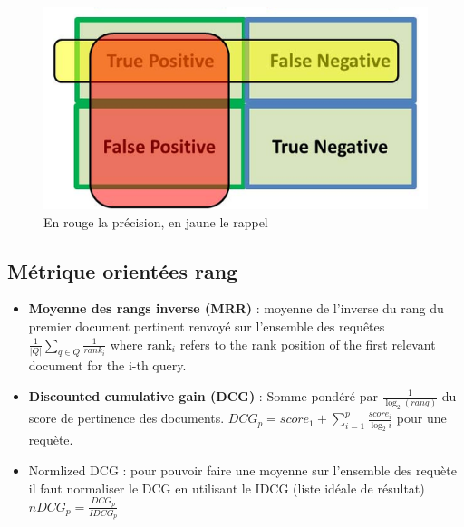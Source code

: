 \documentclass{article}
\theoremstyle{plain}%
\theoremstyle{definition}
\theoremstyle{remark}
\begin{document}
\begin{figure}[!htbp]
    \centering
    \includegraphics*[width=.5\textwidth]{precision_recall_conf_matrix.png}
    \caption{En rouge la précision, en jaune le rappel}
    \label{fig:precision_recall}
\end{figure}

\subsection{Métrique orientées rang}
\begin{itemize}
    \item \textbf{Moyenne des rangs inverse (MRR)} : moyenne de l'inverse du rang du premier document pertinent renvoyé sur l'ensemble des requêtes $ \frac{1}{\left| Q \right| } \sum_{q \in Q}^{} \frac{1}{rank_i} $ where $ \text{rank}_{i}$ refers to the rank position of the first relevant document for the i-th query.
    
    \item \textbf{Discounted cumulative gain (DCG)} :  Somme pondéré par $ \frac{1}{\log_{2} (rang)} $ du score de pertinence des documents. $ DCG_p = score_1 + \sum_{i=1}^{p} \frac{score_i}{\log_{2} i} $ pour une requète. 
    \item Normlized DCG : pour pouvoir faire une moyenne sur l'ensemble des requète il faut normaliser le DCG en utilisant le IDCG (liste idéale de résultat) $ nDCG_p = \frac{DCG_p}{IDCG_p} $ 
\end{itemize}
\end{document}
